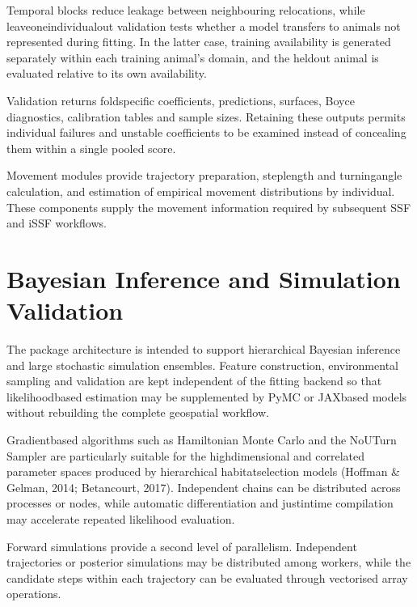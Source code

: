 \documentclass[letterpaper,10pt,english]{sphinxmanual}
\begin{document}
\sphinxAtStartPar
Temporal blocks reduce leakage between neighbouring relocations, while leave\sphinxhyphen{}one\sphinxhyphen{}individual\sphinxhyphen{}out validation tests whether a model transfers to animals not represented during fitting. In the latter case, training availability is generated separately within each training animal’s domain, and the held\sphinxhyphen{}out animal is evaluated relative to its own availability.

\sphinxAtStartPar
Validation returns fold\sphinxhyphen{}specific coefficients, predictions, surfaces, Boyce diagnostics, calibration tables and sample sizes. Retaining these outputs permits individual failures and unstable coefficients to be examined instead of concealing them within a single pooled score.

\sphinxAtStartPar
Movement modules provide trajectory preparation, step\sphinxhyphen{}length and turning\sphinxhyphen{}angle calculation, and estimation of empirical movement distributions by individual. These components supply the movement information required by subsequent SSF and iSSF workflows.


\section{Bayesian Inference and Simulation Validation}
\label{\detokenize{implementation:bayesian-inference-and-simulation-validation}}
\sphinxAtStartPar
The package architecture is intended to support hierarchical Bayesian inference and large stochastic simulation ensembles. Feature construction, environmental sampling and validation are kept independent of the fitting backend so that likelihood\sphinxhyphen{}based estimation may be supplemented by PyMC\sphinxhyphen{} or JAX\sphinxhyphen{}based models without rebuilding the complete geospatial workflow.

\sphinxAtStartPar
Gradient\sphinxhyphen{}based algorithms such as Hamiltonian Monte Carlo and the No\sphinxhyphen{}U\sphinxhyphen{}Turn Sampler are particularly suitable for the high\sphinxhyphen{}dimensional and correlated parameter spaces produced by hierarchical habitat\sphinxhyphen{}selection models (Hoffman \& Gelman, 2014; Betancourt, 2017). Independent chains can be distributed across processes or nodes, while automatic differentiation and just\sphinxhyphen{}in\sphinxhyphen{}time compilation may accelerate repeated likelihood evaluation.

\sphinxAtStartPar
Forward simulations provide a second level of parallelism. Independent trajectories or posterior simulations may be distributed among workers, while the candidate steps within each trajectory can be evaluated through vectorised array operations.
\end{document}
